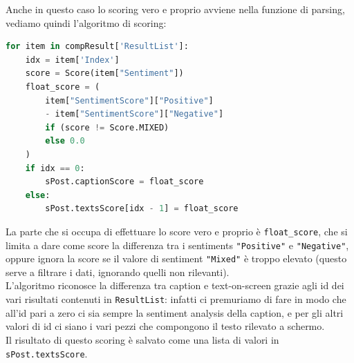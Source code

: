Anche in questo caso lo scoring vero e proprio avviene nella funzione di parsing, vediamo quindi
l'algoritmo di scoring:
\begin{lstlisting}[language=Python]
for item in compResult['ResultList']:
    idx = item['Index']
    score = Score(item["Sentiment"])
    float_score = (
        item["SentimentScore"]["Positive"] 
        - item["SentimentScore"]["Negative"]
        if (score != Score.MIXED)
        else 0.0
    )
    if idx == 0:
        sPost.captionScore = float_score
    else:
        sPost.textsScore[idx - 1] = float_score
\end{lstlisting}
La parte che si occupa di effettuare lo score vero e proprio è \verb+float_score+, che si limita
a dare come score la differenza tra i sentiments \verb+"Positive"+ e \verb+"Negative"+, oppure ignora la score se 
il valore di sentiment \verb+"Mixed"+ è troppo elevato (questo serve a filtrare i dati, ignorando
quelli non rilevanti).\\
L'algoritmo riconosce la differenza tra caption e text-on-screen grazie agli id dei vari risultati contenuti in
\verb+ResultList+: infatti ci premuriamo di fare in modo che all'id pari a zero ci sia sempre la sentiment 
analysis della caption, e per gli altri valori di id ci siano i vari pezzi che compongono il testo rilevato a schermo.\\
Il risultato di questo scoring è salvato come una lista di valori in \verb+sPost.textsScore+.

